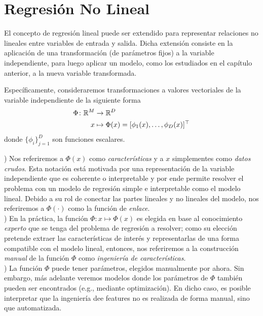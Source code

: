 
\section{Regresión No Lineal}
El concepto de regresión lineal puede ser extendido para representar relaciones no lineales entre variables de entrada y salida. Dicha extensión consiste en la aplicación de una transformación (de parámetros fijos) a la variable independiente, para luego aplicar un modelo, como los estudiados en el capítulo anterior, a la nueva variable transformada. 

Específicamente, consideraremos transformaciones a valores vectoriales de la variable independiente de la siguiente forma
\begin{align}
  \Phi \colon {\mathbb R}^M &\to {\mathbb R}^D \nonumber\\
  x &\mapsto \Phi(x)=[\phi_1(x),\ldots,\phi_D(x)]^\top
\end{align}
donde $\{ \phi_i \}_{j=1}^D$ son funciones escalares. 

\begin{mdframed}[style=discusion, frametitle={\center Observaciones}]

) Nos referiremos a $\Phi(x)$ como \emph{características} y a $x$ simplementes como \emph{datos crudos}. Esta notación está motivada por una representación de la variable independiente que es coherente o interpretable y por ende permite resolver el problema con un modelo de regresión simple e interpretable como el modelo lineal. Debido a su rol de conectar las partes lineales y no lineales del modelo, nos referiremos a $\Phi(\cdot)$ como la función de \emph{enlace}.\\

) En la práctica, la función $\Phi:x\mapsto\Phi(x)$ es elegida en base  al conocimiento \emph{experto} que se tenga del problema de regresión a resolver;  como su elección pretende extraer las características de interés y representarlas  de una forma compatible con el modelo lineal, entonces, nos referiremos a la construcción \emph{manual} de la función $\Phi$ como \emph{ingeniería de características}. \\

) La función $\Phi$ puede tener parámetros, elegidos manualmente por ahora. Sin embargo, más adelante veremos modelos donde los parámetros de $\Phi$ también pueden ser encontrados (e.g., mediante optimización). En dicho caso, es posible interpretar que la ingeniería dee features no es realizada de forma manual, sino que automatizada.  


\end{mdframed}

